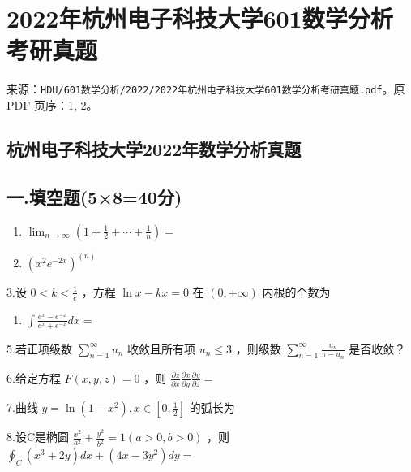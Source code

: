 \documentclass[11pt,fontset=fandol]{ctexart}
\providecommand{\tightlist}{\setlength{\itemsep}{0pt}\setlength{\parskip}{0pt}}
\begin{document}
\section{2022年杭州电子科技大学601数学分析考研真题}\label{ux5e74ux676dux5ddeux7535ux5b50ux79d1ux6280ux5927ux5b66601ux6570ux5b66ux5206ux6790ux8003ux7814ux771fux9898}

来源：\texttt{HDU/601数学分析/2022/2022年杭州电子科技大学601数学分析考研真题.pdf}。原
PDF 页序：1, 2。

\subsection{杭州电子科技大学2022年数学分析真题}\label{ux676dux5ddeux7535ux5b50ux79d1ux6280ux5927ux5b662022ux5e74ux6570ux5b66ux5206ux6790ux771fux9898}

\subsection{一.填空题(5×8=40分)}\label{ux4e00.ux586bux7a7aux98985840ux5206}

\begin{enumerate}
\def\labelenumi{\arabic{enumi}.}
\item
  \(\lim _ { n \to \infty } ( 1 + { \frac { 1 } { 2 } } + \cdots + { \frac { 1 } { n } } ) =\)
\item
  \(( x ^ { 2 } e ^ { - 2 x } ) ^ { ( n ) }\)
\end{enumerate}

3.设 \(0 < k < \frac { 1 } { e }\) ，方程 \(\ln x - k x = 0\) 在
\(( 0 , + \infty )\) 内根的个数为

\begin{enumerate}
\def\labelenumi{\arabic{enumi}.}
\setcounter{enumi}{3}
\tightlist
\item
  \(\int \frac { e ^ { x } - e ^ { - x } } { e ^ { x } + e ^ { - x } } d x =\)
\end{enumerate}

5.若正项级数 \(\sum _ { n = 1 } ^ { \infty } u _ { n }\) 收敛且所有项
\(u _ { n } \leq 3\) ，则级数
\(\sum _ { n = 1 } ^ { \infty } \frac { u _ { n } } { \pi - u _ { n } }\)
是否收敛？

6.给定方程 \(F ( x , y , z ) = 0\) ，则
\(\frac { \partial z } { \partial x } \frac { \partial x } { \partial y } \frac { \partial y } { \partial z } =\)

7.曲线
\(y = \ln ( 1 - x ^ { 2 } ) , x \in \left[ 0 , \frac { 1 } { 2 } \right]\)
的弧长为

8.设C是椭圆
\(\frac { x ^ { 2 } } { a ^ { 2 } } + \frac { y ^ { 2 } } { b ^ { 2 } } = 1 ( a > 0 , b > 0 )\)
，则
\(\oint _ { C } ( x ^ { 3 } + 2 y ) d x + ( 4 x - 3 y ^ { 2 } ) d y =\)
\end{document}
